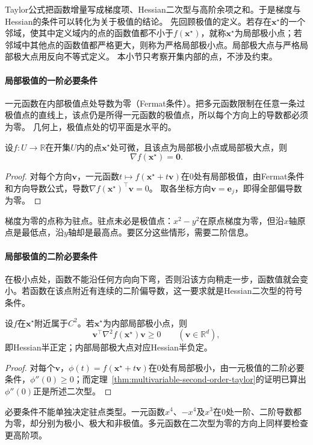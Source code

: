Taylor公式把函数增量写成梯度项、Hessian二次型与高阶余项之和。于是梯度与Hessian的条件可以转化为关于极值的结论。
先回顾极值的定义。若存在$\bm x^\star$的一个邻域，使其中定义域内的点的函数值都不小于$f(\bm x^\star)$，就称$\bm x^\star$为局部极小点；若邻域中其他点的函数值都严格更大，则称为严格局部极小点。局部极大点与严格局部极大点用反向不等式定义。
本小节只考察开集内部的点，不涉及约束。

\paragraph{局部极值的一阶必要条件}
一元函数在内部极值点处导数为零（Fermat条件）。把多元函数限制在任意一条过极值点的直线上，该点仍是所得一元函数的极值点，所以每个方向上的导数都必须为零。
几何上，极值点处的切平面是水平的。
\begin{theorem}[局部极值的一阶必要条件]
\label{thm:multivariable-extremum-first-order}
设$f:U\to\mathbb R$在开集$U$内的点$\bm x^\star$处可微，且该点为局部极小点或局部极大点，则
\begin{equation}
 \nabla f(\bm x^\star)=\bm0.
\label{eq:analysis-first-order-necessary}
\end{equation}
\end{theorem}
\begin{proof}
对每个方向$\bm v$，一元函数$t\mapsto f(\bm x^\star+t\bm v)$在$0$处有局部极值，由Fermat条件和方向导数公式，导数$\nabla f(\bm x^\star)^\top\bm v=0$。
取各坐标方向$\bm v=\bm e_j$，即得全部偏导数为零。
\end{proof}
梯度为零的点称为驻点。驻点未必是极值点：$x^2-y^2$在原点梯度为零，但沿$x$轴原点是最低点，沿$y$轴却是最高点。要区分这些情形，需要二阶信息。

\paragraph{局部极值的二阶必要条件}
在极小点处，函数不能沿任何方向向下弯，否则沿该方向稍走一步，函数值就会变小。若函数在该点附近有连续的二阶偏导数，这一要求就是Hessian二次型的符号条件。
\begin{theorem}[局部极值的二阶必要条件]
\label{thm:multivariable-extremum-second-order}
设$f$在$\bm x^\star$附近属于$C^2$。若$\bm x^\star$为内部局部极小点，则
\begin{equation}
 \bm v^\top\nabla^2f(\bm x^\star)\bm v\geq0
 \qquad(\bm v\in\mathbb R^d),
\label{eq:analysis-second-order-necessary}
\end{equation}
即Hessian半正定；内部局部极大点对应Hessian半负定。
\end{theorem}
\begin{proof}
对每个$\bm v$，$\phi(t)=f(\bm x^\star+t\bm v)$在$0$处有局部极小，由一元极值的二阶必要条件，$\phi''(0)\geq0$；而定理~\ref{thm:multivariable-second-order-taylor}的证明已算出$\phi''(0)$正是所述二次型。
\end{proof}
必要条件不能单独决定驻点类型。一元函数$x^4$、$-x^4$及$x^3$在$0$处一阶、二阶导数都为零，却分别为极小、极大和非极值。多元函数在二次型为零的方向上同样要检查更高阶项。


